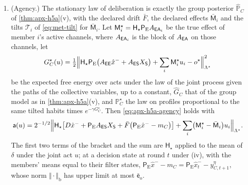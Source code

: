 \begin{theorem}
\begin{enumerate}
The matrix $\mathsf W$ splits as in \eqref{eq:apx-obs-split}, and $\mathsf i_{\mathrm b}$ obeys the second line of \eqref{eq:apx-obs-closed}. Under (H-suff) with $\bar H=\bar R=\Lambda^s$ one has $\varpi_t=0$, $\bar d_{\mathrm o}=\bar d_{\mathrm b}$ and $\mathsf i_{\mathrm b}\le(\theta_{\mathrm b}\mathsf j/(1-\theta_{\mathrm b}))^{1/2}\Vert\mathsf Y\Vert_{\mathrm F}$, so that the right sides of \eqref{eq:apx-blanket-bound} are at most those of \eqref{eq:apx-h5a}. If both defects vanish as linear functions of $X_t$, that is, $D=0$, $\mathsf P_{\mathrm E}A_{\sE\sS}=0$, $\mathsf P_{\mathrm E}A_{\sE\sA}=\bar B\mathsf P_{\mathrm A}$, $\mathsf G=0$ and $\mathsf P_{\mathrm S}A_{\sS\sS}$, $\mathsf P_{\mathrm S}A_{\sS\sI}$ and $\mathsf P_{\mathrm S}A_{\sS\sA}$ are zero, and if $\bar Q=Q^y$, $\bar R=R_{\mathsf T}$ and the members compute without noise, then $\Delta\mathcal F^C_t$ converges to $\frac12\ln\det(P_{\mathrm e}^{-1}P^-_{\mathrm b})$, which is then the value of the right side of the second inequality of \eqref{eq:apx-blanket-bound}, and which vanishes when $\mathsf W_{\mathrm{ins}}=0$.
\item[(v)] (Agency.) The stationary law of deliberation is exactly the group posterior $\hat{\mathbb P}_C$ of \cref{thm:apx-h5a}(v), with the declared drift $\bar F$, the declared effects $\bar{\mathsf M}_i$ and the tilts $\mathcal T_i$ of \eqref{eq:met-tilt} for $\bar{\mathsf M}_i$. Let $\mathsf M^\star_i=\mathsf H_\star\mathsf P_{\mathrm E}A_{\mathsf{E}\mathsf{A}_i}$ be the true effect of member $i$'s active channels, where $A_{\mathsf{E}\mathsf{A}_i}$ is the block of $A_{\mathsf{E}\mathsf{A}}$ on those channels, let
\begin{equation*}
G^\star_C(u)=\tfrac12\Bigl\Vert\mathsf H_\star\mathsf P_{\mathrm E}\bigl(A_{\mathsf{E}\mathsf{E}}\hat x^-+A_{\mathsf{E}\mathsf{S}}X_{\mathsf{S}}\bigr)+\sum_i\mathsf M^\star_iu_i-o^\star\Bigr\Vert^2_{\Lambda^\star}
\end{equation*}
be the expected free energy over acts under the law of the joint process given the paths of the collective variables, up to a constant, $\hat G_C$ that of the group model as in \cref{thm:apx-h5a}(v), and $\mathbb P^\star_C$ the law on profiles proportional to the same tilted habits times $e^{-\gamma G^\star_C}$. Then \eqref{eq:apx-h5a-agency} holds with
\begin{equation}\label{eq:apx-blanket-agency}
\mathsf a(u)=2^{-1/2}\Bigl\Vert\mathsf H_\star\bigl[D\hat x^-+\mathsf P_{\mathrm E}A_{\mathsf{E}\mathsf{S}}X_{\mathsf{S}}+\bar F\bigl(\mathsf P_{\mathrm E}\hat x^--m_C\bigr)\bigr]+\sum_i\bigl(\mathsf M^\star_i-\bar{\mathsf M}_i\bigr)u_i\Bigr\Vert_{\Lambda^\star} .
\end{equation}
The first two terms of the bracket and the sum are $\mathsf H_\star$ applied to the mean of $\delta$ under the joint act $u$; at a decision state at round $t$ under (iv), with the members' means equal to their filter states, $\mathsf P_{\mathrm E}\hat x^--m_C=\mathsf P_{\mathrm E}\hat x^-_t-y^\eta_{C,t+1}$, whose norm $\Vert\cdot\Vert_{\mathrm b}$ has upper limit at most $\bar{\mathsf e}_{\mathrm o}$.
\end{enumerate}
\end{theorem}

